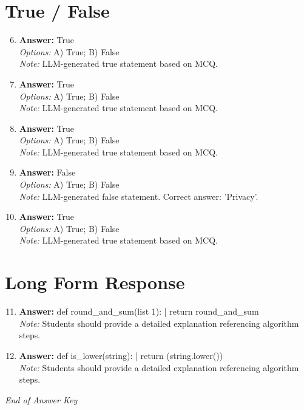 \documentclass[12pt]{article}
\begin{document}
\section*{True / False}
\begin{enumerate}[label=\arabic*.]
\setcounter{enumi}{5}
\item \textbf{Answer:} True
\\ \textit{Options:} A) True; B) False
\\ \textit{Note:} LLM-generated true statement based on MCQ.
\item \textbf{Answer:} True
\\ \textit{Options:} A) True; B) False
\\ \textit{Note:} LLM-generated true statement based on MCQ.
\item \textbf{Answer:} True
\\ \textit{Options:} A) True; B) False
\\ \textit{Note:} LLM-generated true statement based on MCQ.
\item \textbf{Answer:} False
\\ \textit{Options:} A) True; B) False
\\ \textit{Note:} LLM-generated false statement. Correct answer: 'Privacy'.
\item \textbf{Answer:} True
\\ \textit{Options:} A) True; B) False
\\ \textit{Note:} LLM-generated true statement based on MCQ.
\end{enumerate}

\section*{Long Form Response}
\begin{enumerate}[label=\arabic*.]
\setcounter{enumi}{10}
\item \textbf{Answer:} def round\_and\_sum(list 1): | return round\_and\_sum
\\ \textit{Note:} Students should provide a detailed explanation referencing algorithm steps.
\item \textbf{Answer:} def is\_lower(string): | return (string.lower())
\\ \textit{Note:} Students should provide a detailed explanation referencing algorithm steps.
\end{enumerate}

\vfill
\noindent\textit{End of Answer Key}
\end{document}
